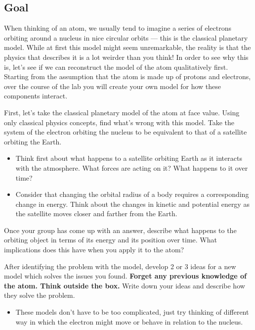 \subsection{Goal} 
When thinking of an atom, we usually tend to imagine a series of electrons orbiting around a nucleus in nice circular orbits --- this is the classical planetary model. While at first this model might seem unremarkable, the reality is that the physics that describes it is a lot weirder than you think! In order to see why this is, let's see if we can reconstruct the model of the atom qualitatively first. Starting from the assumption that the atom is made up of protons and electrons, over the course of the lab you will create your own model for how these components interact.


\begin{steps} 
	\item First, let's take the classical planetary model of the atom at face value. Using only classical physics concepts, find what's wrong with this model. Take the system of the electron orbiting the nucleus to be equivalent to that of a satellite orbiting the Earth. 
	\begin{itemize} 
		\item Think first about what happens to a satellite orbiting Earth as it interacts with the atmosphere. What forces are acting on it? What happens to it over time?
		
		\item Consider that changing the orbital radius of a body requires a corresponding change in energy. Think about the changes in kinetic and potential energy as the satellite moves closer and farther from the Earth. 
	\end{itemize}
	\item Once your group has come up with an answer, describe what happens to the orbiting object in terms of its energy and its position over time. What implications does this have when you apply it to the atom?
	
	\item After identifying the problem with the model, develop 2 or 3 ideas for a new model which solves the issues you found. \textbf{Forget any previous knowledge of the atom. Think outside the box.} Write down your ideas and describe how they solve the problem. 
	\begin{itemize}
		\item These models don't have to be too complicated, just try thinking of different way in which the electron might move or behave in relation to the nucleus.
	\end{itemize} 
\end{steps}

